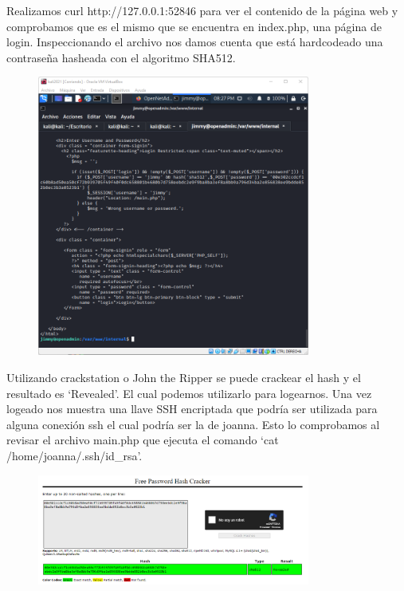 \documentclass{article}
\begin{document}
Realizamos curl http://127.0.0.1:52846 para ver el contenido de la página web y comprobamos que es el mismo que se encuentra en index.php, una página de login. Inspeccionando el archivo nos damos cuenta que está hardcodeado una contraseña hasheada con el algoritmo SHA512. 
\begin{figure}[h]
	\center
	\includegraphics[width=0.8\textwidth]{images/openadmin/12-indexphp.png}
	\caption{}
\end{figure}

Utilizando crackstation o John the Ripper se puede crackear el hash y el resultado es `Revealed'. El cual podemos utilizarlo para logearnos. Una vez logeado nos muestra una llave SSH encriptada que podría ser utilizada para alguna conexión ssh el cual podría ser la de joanna. Esto lo comprobamos al revisar el archivo main.php que ejecuta el comando `cat /home/joanna/.ssh/id\_rsa'.
\begin{figure}[h]
	\center
	\includegraphics[width=0.8\textwidth]{images/openadmin/13-crackstation.png}
	\caption{}
\end{figure}
\end{document}
